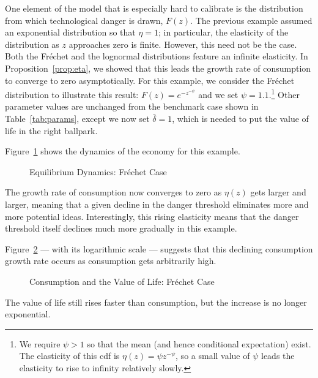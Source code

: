 \documentclass[12pt,twoside]{article}
\begin{document}
One element of the model that is especially hard to calibrate is the
distribution from which technological danger is drawn, $F(z)$. The
previous example assumed an exponential distribution so that $\eta=1$;
in particular, the elasticity of the distribution as $z$ approaches zero
is finite. However, this need not be the case. Both the Fr\'{e}chet and
the lognormal distributions feature an infinite elasticity. In
Proposition~\ref{prop:eta}, we showed that this leads the growth rate of
consumption to converge to zero asymptotically. For this example, we
consider the Fr\'{e}chet distribution to illustrate this result:
$F(z)=e^{-z^{-\psi}}$ and we set $\psi=1.1$.\footnote{We require
  $\psi>1$ so that the mean (and hence conditional expectation) exist.
  The elasticity of this cdf is $\eta(z)=\psi z^{-\psi}$, so a small
  value of $\psi$ leads the elasticity to rise to infinity relatively
  slowly.} Other parameter values are unchanged from the benchmark case
shown in Table~\ref{tab:params}, except we now set $\bar{\delta}=1$,
which is needed to put the value of life in the right ballpark.

Figure~\ref{fig:dynFrech} shows the dynamics of the economy for this example.
\begin{figure}[tp]
\caption{Equilibrium Dynamics: Fr\'{e}chet Case}
\label{fig:dynFrech}
\end{figure} 
The growth rate of consumption now converges to zero as $\eta(z)$ gets
larger and larger, meaning that a given decline in the danger threshold
eliminates more and more potential ideas. Interestingly, this rising
elasticity means that the danger threshold itself declines much more
gradually in this example.

Figure~\ref{fig:vFrech} --- with its logarithmic scale --- suggests that
this declining consumption growth rate occurs as consumption gets
arbitrarily high.
\begin{figure}[tp]
\caption{Consumption and the Value of Life: Fr\'{e}chet Case}
\label{fig:vFrech}
\end{figure} 
The value of life still rises faster than consumption, but the increase
is no longer exponential.
\end{document}
